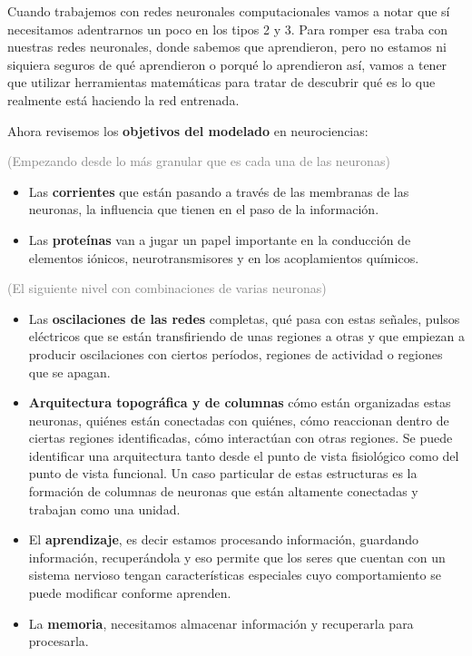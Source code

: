 Cuando trabajemos con redes neuronales computacionales vamos a notar que sí necesitamos adentrarnos un poco en los tipos 2 y 3. Para romper esa traba con nuestras redes neuronales, donde sabemos que aprendieron, pero no estamos ni siquiera seguros de qué aprendieron o porqué lo aprendieron así, vamos a tener que utilizar herramientas matemáticas para tratar de descubrir qué es lo que realmente está haciendo la red entrenada. 


Ahora revisemos los \textbf{objetivos del modelado} en neurociencias:

\textcolor{gray}{(Empezando desde lo más granular que es cada una de las neuronas)}

\begin{itemize}
 \item Las \textbf{corrientes} que están pasando a través de las membranas de las neuronas, la influencia que tienen en el paso de la información. 
 
 \item Las \textbf{proteínas} van a jugar un papel importante en la conducción de elementos iónicos, neurotransmisores y en los acoplamientos químicos.
\end{itemize}

\textcolor{gray}{(El siguiente nivel con combinaciones de varias neuronas)}

\begin{itemize}
 \item Las \textbf{oscilaciones de las redes} completas, qué pasa con estas señales, pulsos eléctricos que se están transfiriendo de unas regiones a otras y que empiezan a producir oscilaciones con ciertos períodos,  regiones de actividad o regiones que se apagan.
 
 \item \textbf{Arquitectura topográfica y de columnas} cómo están organizadas estas neuronas, quiénes están conectadas con quiénes, cómo reaccionan dentro de ciertas regiones identificadas, cómo interactúan con otras regiones. Se puede identificar una arquitectura tanto desde el punto de vista fisiológico como del punto de vista funcional. Un caso particular de estas estructuras es la formación de columnas de neuronas que están altamente conectadas y trabajan como una unidad.
 
 \item El \textbf{aprendizaje}, es decir estamos procesando información, guardando información, recuperándola y eso permite que los seres que cuentan con un sistema nervioso tengan características especiales cuyo comportamiento se puede modificar conforme aprenden. 
 
 \item La \textbf{memoria}, necesitamos almacenar información y recuperarla para procesarla. 
\end{itemize}



